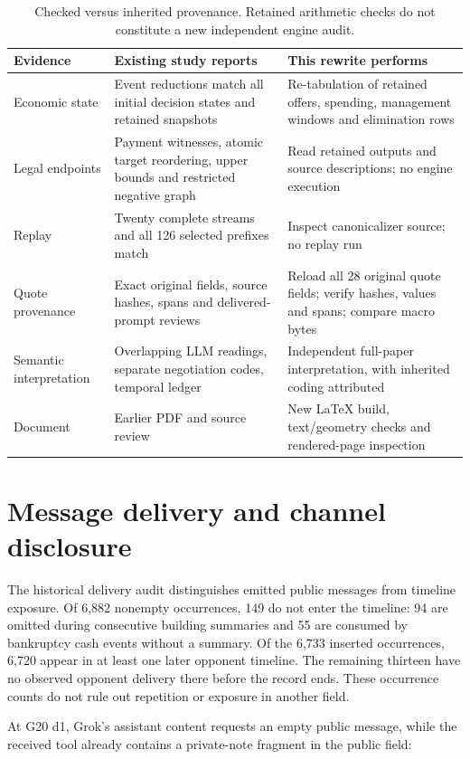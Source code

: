 \begin{table}[htbp]
\centering\small
\begin{tabularx}{\linewidth}{L{3.1cm}YY}
\toprule Evidence & Existing study reports & This rewrite performs\\\midrule
Economic state & Event reductions match all initial decision states and retained snapshots & Re-tabulation of retained offers, spending, management windows and elimination rows\\
Legal endpoints & Payment witnesses, atomic target reordering, upper bounds and restricted negative graph & Read retained outputs and source descriptions; no engine execution\\
Replay & Twenty complete streams and all 126 selected prefixes match & Inspect canonicalizer source; no replay run\\
Quote provenance & Exact original fields, source hashes, spans and delivered-prompt reviews & Reload all 28 original quote fields; verify hashes, values and spans; compare macro bytes\\
Semantic interpretation & Overlapping LLM readings, separate negotiation codes, temporal ledger & Independent full-paper interpretation, with inherited coding attributed\\
Document & Earlier PDF and source review & New LaTeX build, text/geometry checks and rendered-page inspection\\\bottomrule
\end{tabularx}
\caption{Checked versus inherited provenance. Retained arithmetic checks do not constitute a new independent engine audit.}
\end{table}

\section{Message delivery and channel disclosure}
\label{app:disclosure}

The historical delivery audit distinguishes emitted public messages from timeline exposure. Of 6,882 nonempty occurrences, 149 do not enter the timeline: 94 are omitted during consecutive building summaries and 55 are consumed by bankruptcy cash events without a summary. Of the 6,733 inserted occurrences, 6,720 appear in at least one later opponent timeline. The remaining thirteen have no observed opponent delivery there before the record ends. These occurrence counts do not rule out repetition or exposure in another field.

At G20 d1, Grok's assistant content requests an empty public message, while the received tool already contains a private-note fragment in the public field:

